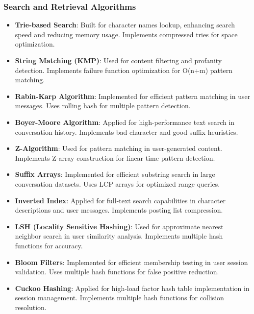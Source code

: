 \documentclass[conference]{IEEEtran}
\begin{document}
\subsubsection{Search and Retrieval Algorithms}
\begin{itemize}
\item \textbf{Trie-based Search}: Built for character names lookup, enhancing search speed and reducing memory usage. Implements compressed tries for space optimization.
\item \textbf{String Matching (KMP)}: Used for content filtering and profanity detection. Implements failure function optimization for O(n+m) pattern matching.
\item \textbf{Rabin-Karp Algorithm}: Implemented for efficient pattern matching in user messages. Uses rolling hash for multiple pattern detection.
\item \textbf{Boyer-Moore Algorithm}: Applied for high-performance text search in conversation history. Implements bad character and good suffix heuristics.
\item \textbf{Z-Algorithm}: Used for pattern matching in user-generated content. Implements Z-array construction for linear time pattern detection.
\item \textbf{Suffix Arrays}: Implemented for efficient substring search in large conversation datasets. Uses LCP arrays for optimized range queries.
\item \textbf{Inverted Index}: Applied for full-text search capabilities in character descriptions and user messages. Implements posting list compression.
\item \textbf{LSH (Locality Sensitive Hashing)}: Used for approximate nearest neighbor search in user similarity analysis. Implements multiple hash functions for accuracy.
\item \textbf{Bloom Filters}: Implemented for efficient membership testing in user session validation. Uses multiple hash functions for false positive reduction.
\item \textbf{Cuckoo Hashing}: Applied for high-load factor hash table implementation in session management. Implements multiple hash functions for collision resolution.
\end{itemize}
\end{document}
